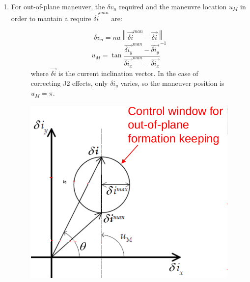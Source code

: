 \documentclass[a4paper]{article}
\newcommand\norm[1]{\left\lVert#1\right\rVert}
\begin{document}
\begin{enumerate}[label=\emph{\alph*)}]
  \item %
    For out-of-plane maneuver, the $\delta v_n$ required and the maneuvre location $u_M$ in order to mantain a require $\vec{\delta i}^{man}$ are:
    \begin{figure}[h]
      \begin{minipage}{0.5\textwidth}
	\[\delta v_n = n a \norm{\vec{\delta i}^{man}-\vec{\delta i}} \]
	\[ u_M = \tan{\frac{\vec{\delta i_y}^{man}-\vec{\delta i_y}}{\vec{\delta i_x}^{man}-\vec{\delta i_x}}}^{-1} \]
	where $\vec{\delta i}$ is the current inclination vector. In the case of correcting J2 effects, only $\delta i_y$ varies, so the maneuver position is $u_M = \pi$.
      \end{minipage}
      \begin{minipage}{0.5\textwidth}
	\centering
	\includegraphics[width=\textwidth]{Out-of-plane_maneuvre}
      \end{minipage}
    \end{figure}


\end{enumerate}
\end{document}
